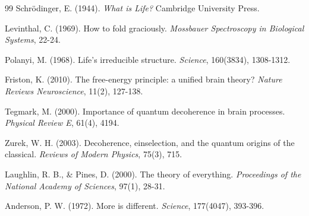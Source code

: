 \documentclass[12pt,a4paper]{article}
\begin{document}
\begin{thebibliography}{99}
Schrödinger, E. (1944). \textit{What is Life?} Cambridge University Press.

Levinthal, C. (1969). How to fold graciously. \textit{Mossbauer Spectroscopy in Biological Systems}, 22-24.

Polanyi, M. (1968). Life's irreducible structure. \textit{Science}, 160(3834), 1308-1312.

Friston, K. (2010). The free-energy principle: a unified brain theory? \textit{Nature Reviews Neuroscience}, 11(2), 127-138.

Tegmark, M. (2000). Importance of quantum decoherence in brain processes. \textit{Physical Review E}, 61(4), 4194.

Zurek, W. H. (2003). Decoherence, einselection, and the quantum origins of the classical. \textit{Reviews of Modern Physics}, 75(3), 715.

Laughlin, R. B., \& Pines, D. (2000). The theory of everything. \textit{Proceedings of the National Academy of Sciences}, 97(1), 28-31.

Anderson, P. W. (1972). More is different. \textit{Science}, 177(4047), 393-396.

\end{thebibliography}
\end{document}
